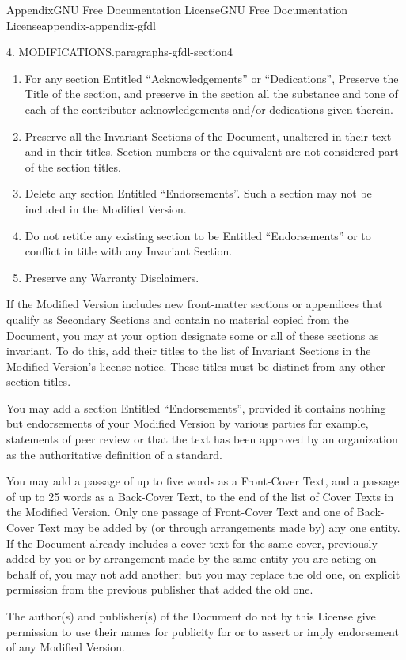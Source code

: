 \documentclass[twoside,10pt,]{book}
\numberwithin{equation}{part}
\begin{document}
\begin{appendixptx}{Appendix}{GNU Free Documentation License}{}{GNU Free Documentation License}{}{}{appendix-appendix-gfdl}
\begin{paragraphs}{4. MODIFICATIONS.}{paragraphs-gfdl-section4}
\begin{enumerate}[label=\Alph*.]
\item{}For any section Entitled ``Acknowledgements'' or ``Dedications'', Preserve the Title of the section, and preserve in the section all the substance and tone of each of the contributor acknowledgements and\slash{}or dedications given therein.%
\item{}Preserve all the Invariant Sections of the Document, unaltered in their text and in their titles. Section numbers or the equivalent are not considered part of the section titles.%
\item{}Delete any section Entitled ``Endorsements''. Such a section may not be included in the Modified Version.%
\item{}Do not retitle any existing section to be Entitled ``Endorsements'' or to conflict in title with any Invariant Section.%
\item{}Preserve any Warranty Disclaimers.%
\end{enumerate}
If the Modified Version includes new front-matter sections or appendices that qualify as Secondary Sections and contain no material copied from the Document, you may at your option designate some or all of these sections as invariant. To do this, add their titles to the list of Invariant Sections in the Modified Version's license notice. These titles must be distinct from any other section titles.%
\par
You may add a section Entitled ``Endorsements'', provided it contains nothing but endorsements of your Modified Version by various parties \textemdash{} for example, statements of peer review or that the text has been approved by an organization as the authoritative definition of a standard.%
\par
You may add a passage of up to five words as a Front-Cover Text, and a passage of up to 25 words as a Back-Cover Text, to the end of the list of Cover Texts in the Modified Version. Only one passage of Front-Cover Text and one of Back-Cover Text may be added by (or through arrangements made by) any one entity. If the Document already includes a cover text for the same cover, previously added by you or by arrangement made by the same entity you are acting on behalf of, you may not add another; but you may replace the old one, on explicit permission from the previous publisher that added the old one.%
\par
The author(s) and publisher(s) of the Document do not by this License give permission to use their names for publicity for or to assert or imply endorsement of any Modified Version.%
\end{paragraphs}%

\end{appendixptx}
\end{document}
